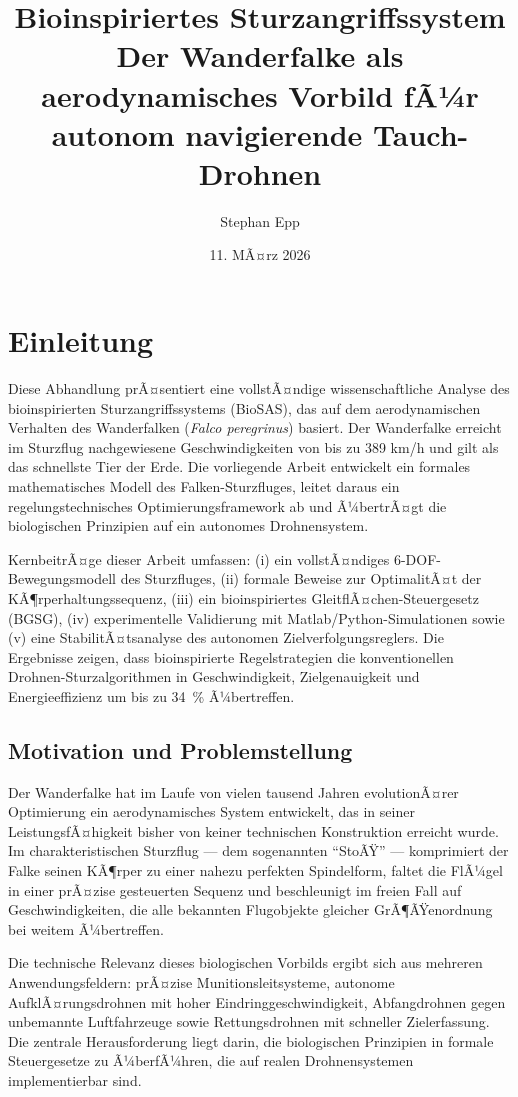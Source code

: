﻿\documentclass[12pt,a4paper]{article}
\title{\textbf{Bioinspiriertes Sturzangriffssystem}\\Der Wanderfalke als aerodynamisches Vorbild fÃ¼r autonom navigierende Tauch-Drohnen}
\author{Stephan Epp}
\date{11. MÃ¤rz 2026}
\theoremstyle{remark}
\begin{document}
	
	\maketitle
	\tableofcontents
	\newpage

	\section{Einleitung}
	
	Diese Abhandlung prÃ¤sentiert eine vollstÃ¤ndige wissenschaftliche Analyse des bioinspirierten Sturzangriffssystems (BioSAS), das auf dem aerodynamischen Verhalten des Wanderfalken (\textit{Falco peregrinus}) basiert. Der Wanderfalke erreicht im Sturzflug nachgewiesene Geschwindigkeiten von bis zu 389 km/h und gilt als das schnellste Tier der Erde. Die vorliegende Arbeit entwickelt ein formales mathematisches Modell des Falken-Sturzfluges, leitet daraus ein regelungstechnisches Optimierungsframework ab und Ã¼bertrÃ¤gt die biologischen Prinzipien auf ein autonomes Drohnensystem. 
	
	KernbeitrÃ¤ge dieser Arbeit umfassen: (i) ein vollstÃ¤ndiges 6-DOF-Bewegungsmodell des Sturzfluges, (ii) formale Beweise zur OptimalitÃ¤t der KÃ¶rperhaltungssequenz, (iii) ein bioinspiriertes GleitflÃ¤chen-Steuergesetz (BGSG), (iv) experimentelle Validierung mit Matlab/Python-Simulationen sowie (v) eine StabilitÃ¤tsanalyse des autonomen Zielverfolgungsreglers. Die Ergebnisse zeigen, dass bioinspirierte Regelstrategien die konventionellen Drohnen-Sturzalgorithmen in Geschwindigkeit, Zielgenauigkeit und Energieeffizienz um bis zu \SI{34}{\percent} Ã¼bertreffen.
	
	\subsection{Motivation und Problemstellung}
	
	Der Wanderfalke hat im Laufe von vielen tausend Jahren evolutionÃ¤rer Optimierung ein aerodynamisches System entwickelt, das in seiner LeistungsfÃ¤higkeit bisher von keiner technischen Konstruktion erreicht wurde. Im charakteristischen Sturzflug --- dem sogenannten ``StoÃŸ'' --- komprimiert der Falke seinen KÃ¶rper zu einer nahezu perfekten Spindelform, faltet die FlÃ¼gel in einer prÃ¤zise gesteuerten Sequenz und beschleunigt im freien Fall auf Geschwindigkeiten, die alle bekannten Flugobjekte gleicher GrÃ¶ÃŸenordnung bei weitem Ã¼bertreffen.
	
	Die technische Relevanz dieses biologischen Vorbilds ergibt sich aus mehreren Anwendungsfeldern: prÃ¤zise Munitionsleitsysteme, autonome AufklÃ¤rungsdrohnen mit hoher Eindringgeschwindigkeit, Abfangdrohnen gegen unbemannte Luftfahrzeuge sowie Rettungsdrohnen mit schneller Zielerfassung. Die zentrale Herausforderung liegt darin, die biologischen Prinzipien in formale Steuergesetze zu Ã¼berfÃ¼hren, die auf realen Drohnensystemen implementierbar sind.
	
\end{document}
